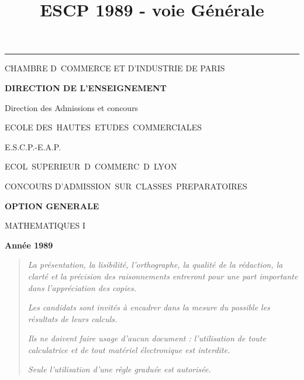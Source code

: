 \documentclass[11pt]{article}%
\title{\bf \vspace{-2cm} ESCP 1989 - voie Générale} %
\author{} %
\date{} %
\begin{document}
\maketitle %
\vspace{-1.4cm}\hrule %
\thispagestyle{fancy}

\vspace*{.2cm}




\begin{center}
{\small CHAMBRE D\E\ COMMERCE ET D'INDUSTRIE DE PARIS}

\textbf{DIRECTION DE L'ENSEIGNEMENT}

Direction des Admissions et concours

\underline{\hspace*{3cm}}

{\Large ECOLE DES\ HAUTES\ ETUDES\ COMMERCIALES}

{\Large E.S.C.P.-E.A.P.}

{\Large ECOL\E\ SUPERIEUR\E\ D\E\ COMMERC\E\ D\E\ LYON}{\large }

CONCOURS D'ADMISSION\ SUR\ CLASSES\ PREPARATOIRES

\underline{\hspace*{3cm}}

\textbf{OPTION GENERALE}

{\Large MATHEMATIQUES I}

\textbf{Année 1989}

\underline{\hspace*{3cm}}
\end{center}

\begin{quotation}
\noindent \textsl{La présentation, la lisibilité, l'orthographe, la
qualité
de la rédaction, la clarté et la précision des raisonnements entreront
pour
une part importante dans l'appréciation des copies.}

\noindent \textsl{Les candidats sont invités à encadrer dans la mesure
du
possible les résultats de leurs calculs.}

\noindent \textsl{Ils ne doivent faire usage d'aucun document :
l'utilisation de toute calculatrice et de tout matériel électronique
est
interdite.}

\noindent \textsl{Seule l'utilisation d'une règle graduée est
autorisée.}

\noindent \textsl{\hrulefill }
\end{quotation}
\end{document}
